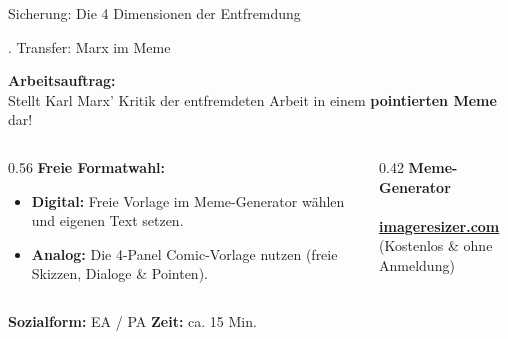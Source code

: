 \documentclass{beamer}
\begin{document}
\begin{frame}[t]{\faProjectDiagram \enskip Sicherung: Die 4 Dimensionen der Entfremdung}

\vfill

\end{frame}

\begin{frame}[t]{\faImages {}. Transfer: Marx im Meme}
\vspace{-0.1cm}

\textbf{\large \faLightbulb \enskip Arbeitsauftrag:}\\[4pt]
\normalsize
Stellt Karl Marx’ Kritik der entfremdeten Arbeit in einem \textbf{pointierten Meme} dar!
\vspace{0.25cm}

\begin{columns}[T]
    \begin{column}{0.56\textwidth}
        \textbf{\small \faPalette \enskip Freie Formatwahl:}\\[6pt]
        \small
        \begin{itemize}
            \setlength{\itemsep}{8pt}
            \item[\faLaptopCode] \textbf{Digital:} Freie Vorlage im Meme-Generator wählen und eigenen Text setzen.
            \item[\faPen] \textbf{Analog:} Die 4-Panel Comic-Vorlage nutzen (freie Skizzen, Dialoge \& Pointen).
        \end{itemize}
    \end{column}
    
    \begin{column}{0.42\textwidth}
        \centering
        \textbf{\small \faQrcode \enskip Meme-Generator}\\[5pt]
        \\[4pt]
        {\scriptsize \href{https://imageresizer.com/de/meme-generator}{\textbf{\color{primaryBlue}imageresizer.com}}}\\[2pt]
        {\tiny \color{gray}(Kostenlos \& ohne Anmeldung)}
    \end{column}
\end{columns}

\vspace{0.4cm}
\centering
{\small \textbf{\faUsers \enskip Sozialform:} EA / PA \qquad \textbf{\faClock \enskip Zeit:} ca. 15 Min.}

\end{frame}
\end{document}
